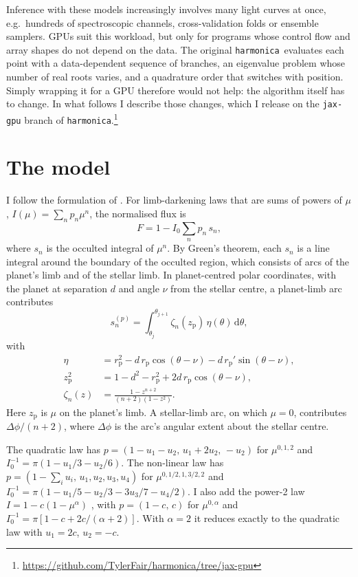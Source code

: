 \documentclass[twocolumn]{aastex701}
\newcommand{\harmonica}{\texttt{harmonica}}
\newcommand{\dd}{\mathrm{d}}
\begin{document}
Inference with these models increasingly involves many light curves at
once, e.g.\ hundreds of spectroscopic channels, cross-validation folds or
ensemble samplers. GPUs suit this workload, but only for programs whose
control flow and array shapes do not depend on the data. The original
\harmonica\ evaluates each point with a data-dependent sequence of
branches, an eigenvalue problem whose number of real roots varies, and a
quadrature order that switches with position. Simply wrapping it for a GPU
therefore would not help: the algorithm itself has to change. In what
follows I describe those changes, which I release on the
\texttt{jax-gpu} branch of \harmonica.\footnote{\url{https://github.com/TylerFair/harmonica/tree/jax-gpu}}

\section{The model} \label{sec:model}

I follow the formulation of \citet{grant2023}. For limb-darkening laws
that are sums of powers of $\mu$, $I(\mu) = \sum_n p_n \mu^n$, the
normalised flux is
\begin{equation}
F = 1 - I_0 \sum_n p_n\, s_n,
\end{equation}
where $s_n$ is the occulted integral of $\mu^n$. By Green's theorem, each
$s_n$ is a line integral around the boundary of the occulted region,
which consists of arcs of the planet's limb and of the stellar limb. In
planet-centred polar coordinates, with the planet at separation $d$ and
angle $\nu$ from the stellar centre, a planet-limb arc contributes
\begin{equation}
s_n^{(p)} = \int_{\theta_j}^{\theta_{j+1}} \zeta_n(z_\mathrm{p})\,
\eta(\theta)\, \dd\theta,
\label{eq:planet_arc}
\end{equation}
with
\begin{align}
\eta &= r_\mathrm{p}^2 - d\, r_\mathrm{p} \cos(\theta-\nu)
       - d\, r_\mathrm{p}' \sin(\theta-\nu), \\
z_\mathrm{p}^2 &= 1 - d^2 - r_\mathrm{p}^2
       + 2 d\, r_\mathrm{p} \cos(\theta-\nu), \\
\zeta_n(z) &= \frac{1 - z^{n+2}}{(n+2)(1-z^2)}.
\label{eq:zeta}
\end{align}
Here $z_\mathrm{p}$ is $\mu$ on the planet's limb. A stellar-limb arc,
on which $\mu=0$, contributes $\Delta\phi/(n+2)$, where $\Delta\phi$ is
the arc's angular extent about the stellar centre.

The quadratic law has $p = (1-u_1-u_2,\, u_1+2u_2,\, -u_2)$ for
$\mu^{0,1,2}$ and $I_0^{-1} = \pi(1 - u_1/3 - u_2/6)$. The non-linear law
has $p = (1-\sum_i u_i,\, u_1, u_2, u_3, u_4)$ for $\mu^{0,1/2,1,3/2,2}$
and $I_0^{-1} = \pi(1 - u_1/5 - u_2/3 - 3u_3/7 - u_4/2)$. I also add the
power-2 law $I = 1 - c(1-\mu^\alpha)$ \citep{hestroffer1997, maxted2018},
with $p=(1-c,\, c)$ for $\mu^{0,\alpha}$ and
$I_0^{-1} = \pi[1 - c + 2c/(\alpha+2)]$. With $\alpha=2$ it reduces
exactly to the quadratic law with $u_1=2c$, $u_2=-c$.
\end{document}
